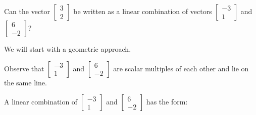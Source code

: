 \documentclass{ximera}
\begin{document}
\begin{example}\label{ex:lincombgeometry2}
Can the vector $\begin{bmatrix}3\\2\end{bmatrix}$ be written as a linear combination of vectors $\begin{bmatrix}-3\\1\end{bmatrix}$ and $\begin{bmatrix}6\\-2\end{bmatrix}$?
\begin{explanation}
We will start with a geometric approach.
\begin{center}
\end{center}

Observe that $\begin{bmatrix}-3\\1\end{bmatrix}$ and $\begin{bmatrix}6\\-2\end{bmatrix}$ are scalar multiples of each other and lie on the same line.  

A linear combination of $\begin{bmatrix}-3\\1\end{bmatrix}$ and $\begin{bmatrix}6\\-2\end{bmatrix}$ has the form:


\end{explanation}
\end{example}
\end{document}
